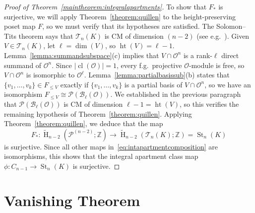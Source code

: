 \documentclass[11 pt]{article}
\theoremstyle{plain}
\theoremstyle{definition}
\numberwithin{equation}{section}
\newcommand\Z{\ensuremath{\mathbb{Z}}}
\DeclareMathOperator{\HH}{H}
\renewcommand{\O}{\mathcal{O}}
\newcommand\PartialBases{\ensuremath{\mathcal{B}}}
\DeclareMathOperator{\class}{cl}
\newcommand\Tits{\ensuremath{\mathcal{T}}}
\DeclareMathOperator{\St}{St}
\newcommand\Poset{\ensuremath{\mathcal{P}}}
\newcommand\PP{\Poset^{(n-2)}}
\DeclareMathOperator{\height}{ht}
\newcommand\abs[1]{\left\lvert#1\right\rvert}
\newcommand\iso{\cong}
\begin{document}
\begin{proof}[{Proof of Theorem~\ref{maintheorem:integralapartments}}]
To show that $F_{\ast}$ is surjective, we will apply Theorem~\ref{theorem:quillen} to the height-preserving poset map $F$, so we must
verify that its hypotheses are satisfied. The
Solomon--Tits theorem says that $\Tits_n(K)$ is CM of dimension
$(n-2)$ (see e.g.\ \cite[Example~8.2]{QuillenPoset}). Given  $V \in \Tits_n(K)$, let $\ell = \dim(V)$, so $\height(V) = \ell-1$.  Lemma~\ref{lemma:summandsubspace}(c) 
implies that $V \cap \O^n$ is a rank-$\ell$ direct summand of $\O^n$. Since $\abs{\class(\O)} = 1$, every f.g.\ projective $\O$-module is free, so $V \cap \O^n$ is isomorphic to $\O^\ell$. Lemma~\ref{lemma:partialbasissub}(b) states that $\{v_1,\ldots,v_k\}\in F_{\leq V}$ exactly if $\{v_1,\ldots,v_k\}$ is a partial basis of $V\cap \O^n$, so we have an isomorphism $F_{\leq V} \iso \Poset(\PartialBases_{\ell}(\O))$. We established in the previous paragraph that $\Poset(\PartialBases_{\ell}(\O))$ is CM of
dimension $\ell-1 = \height(V)$, so this verifies the remaining hypothesis of Theorem~\ref{theorem:quillen}. Applying Theorem~\ref{theorem:quillen}, we deduce that the map
\[F_{\ast}\colon \widetilde{\HH}_{n-2}(\PP;\Z) \rightarrow \widetilde{\HH}_{n-2}(\Tits_n(K);\Z) = \St_n(K)\]
is surjective. Since all other maps in~\eqref{eq:intapartmentcomposition} are isomorphisms, this shows that the integral apartment class map $\phi\colon C_{n-1}\to \St_n(K)$ is surjective.
\end{proof}

\section{Vanishing Theorem}
\label{section:vanishing}
\end{document}
